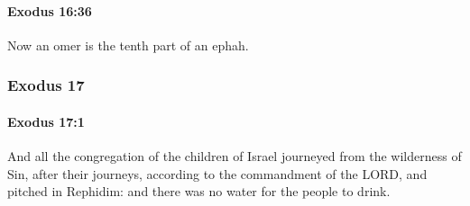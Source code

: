 		\paragraph{Exodus 16:36} %
			\label{EXODUS-16-36}

			Now an omer is the tenth part of an ephah.

	\subsubsection{Exodus 17} %
		\label{EXODUS-17}

		\paragraph{Exodus 17:1} %
			\label{EXODUS-17-1}

			And all the congregation of the children of Israel journeyed from the wilderness of Sin, after their journeys, according to the commandment of the LORD, and pitched in Rephidim: and there was no water for the people to drink.

